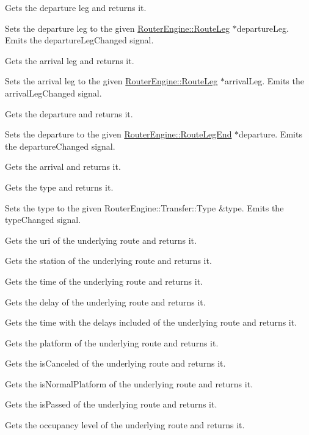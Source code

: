 Gets the departure leg and returns it.

Sets the departure leg to the given \mbox{\hyperlink{classRouterEngine_1_1RouteLeg}{Router\+Engine\+::\+Route\+Leg}} $\ast$departure\+Leg. Emits the departure\+Leg\+Changed signal.

Gets the arrival leg and returns it.

Sets the arrival leg to the given \mbox{\hyperlink{classRouterEngine_1_1RouteLeg}{Router\+Engine\+::\+Route\+Leg}} $\ast$arrival\+Leg. Emits the arrival\+Leg\+Changed signal.

Gets the departure and returns it.

Sets the departure to the given \mbox{\hyperlink{classRouterEngine_1_1RouteLegEnd}{Router\+Engine\+::\+Route\+Leg\+End}} $\ast$departure. Emits the departure\+Changed signal.

Gets the arrival and returns it.

Gets the type and returns it.

Sets the type to the given Router\+Engine\+::\+Transfer\+::\+Type \&type. Emits the type\+Changed signal.

Gets the uri of the underlying route and returns it.

Gets the station of the underlying route and returns it.

Gets the time of the underlying route and returns it.

Gets the delay of the underlying route and returns it.

Gets the time with the delays included of the underlying route and returns it.

Gets the platform of the underlying route and returns it.

Gets the is\+Canceled of the underlying route and returns it.

Gets the is\+Normal\+Platform of the underlying route and returns it.

Gets the is\+Passed of the underlying route and returns it.

Gets the occupancy level of the underlying route and returns it. 